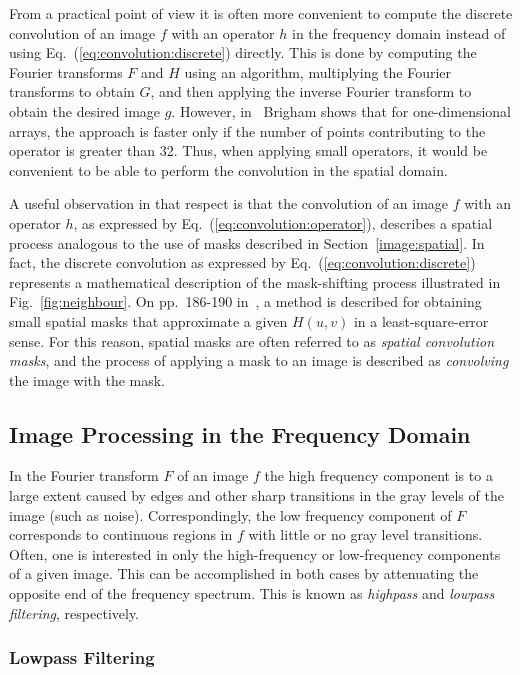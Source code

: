 From a practical point of view it is often more convenient to compute
the discrete convolution of an image $f$ with an operator $h$ in the
frequency domain instead of using Eq.~(\ref{eq:convolution:discrete})
directly.  This is done by computing the Fourier transforms $F$ and
$H$ using an {\fft} algorithm, multiplying the Fourier transforms to
obtain $G$, and then applying the inverse Fourier transform to obtain
the desired image $g$.  However, in~\cite{brigham} Brigham shows that
for one-dimensional arrays, the {\fft} approach is faster only if the
number of points contributing to the operator is greater than 32.
Thus, when applying small operators, it would be convenient to be able
to perform the convolution in the spatial domain.

A useful observation in that respect is that the convolution of an
image $f$ with an operator $h$, as expressed by
Eq.~(\ref{eq:convolution:operator}), describes a spatial process
analogous to the use of masks described in
Section~\ref{image:spatial}.  In fact, the discrete convolution as
expressed by Eq.~(\ref{eq:convolution:discrete}) represents a
mathematical description of the mask-shifting process illustrated in
Fig.~\ref{fig:neighbour}.  On pp.\ 186-190 in~\cite{digim}, a method
is described for obtaining small spatial masks that approximate a
given $H(u,v)$ in a least-square-error sense.  For this reason,
spatial masks are often referred to as {\em spatial convolution
  masks\/}, and the process of applying a mask to an image is
described as {\em convolving\/} the image with the mask.

\subsection{Image Processing in the Frequency Domain}
\label{image:frequency:image}

In the Fourier transform $F$ of an image $f$ the high frequency
component is to a large extent caused by edges and other sharp
transitions in the gray levels of the image (such as noise).
Correspondingly, the low frequency component of $F$ corresponds to
continuous regions in $f$ with little or no gray level transitions.
Often, one is interested in only the high-frequency or low-frequency
components of a given image.  This can be accomplished in both cases
by attenuating the opposite end of the frequency spectrum.  This is
known as {\em highpass\/} and {\em lowpass filtering\/}, respectively.

\subsubsection{Lowpass Filtering}

